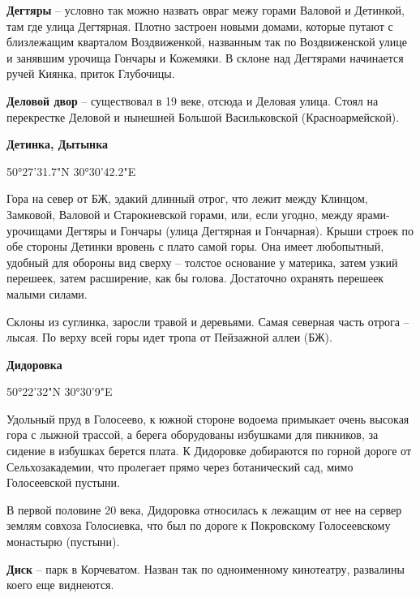 \medskip

\textbf{Дегтяры} – условно так можно назвать овраг межу горами Валовой и Детинкой, там где улица Дегтярная. Плотно застроен новыми домами, которые путают с близлежащим кварталом Воздвиженкой, названным так по Воздвиженской улице и занявшим урочища Гончары и Кожемяки. В склоне над Дегтярами начинается ручей Киянка, приток Глубочицы.\\

\medskip

\textbf{Деловой двор} – существовал в 19 веке, отсюда и Деловая улица. Стоял на перекрестке Деловой и нынешней Большой Васильковской (Красноармейской).\\

\medskip

\textbf{Детинка, Дытынка} 

50°27'31.7"N 30°30'42.2"E

Гора на север от БЖ, эдакий длинный отрог, что лежит между Клинцом, Замковой, Валовой и Старокиевской горами, или, если угодно, между ярами-урочищами Дегтяры и Гончары (улица Дегтярная и Гончарная). Крыши строек по обе стороны Детинки вровень с плато самой горы. Она имеет любопытный, удобный для обороны вид сверху – толстое основание у материка, затем узкий перешеек, затем расширение, как бы голова. Достаточно охранять перешеек малыми силами.

Склоны из суглинка, заросли травой и деревьями. Самая северная часть отрога – лысая. По верху всей горы идет тропа от Пейзажной аллеи (БЖ).\\ 

\medskip

\textbf{Дидоровка}
 
50°22'32"N 30°30'9"E

Удольный пруд в Голосеево, к южной стороне водоема примыкает очень высокая гора с лыжной трассой, а берега оборудованы избушками для пикников, за сидение в избушках берется плата. К Дидоровке добираются по горной дороге от Сельхозакадемии, что пролегает прямо через ботанический сад, мимо Голосеевской пустыни.

В первой половине 20 века, Дидоровка относилась к лежащим от нее на сервер землям совхоза Голосиевка, что был по дороге к Покровскому Голосеевскому монастырю (пустыни).\\

\medskip

\textbf{Диск} – парк в Корчеватом. Назван так по одноименному кинотеатру, развалины коего еще виднеются.\\

